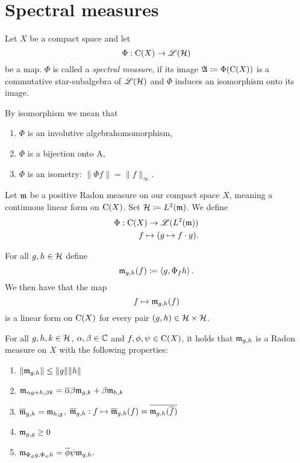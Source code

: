 
\section{Spectral measures}

\begin{defi}
 
 Let $X$ be a compact space and let
 \[
  \Phi : \operatorname{C} (X) \to \mathscr{L}(\mathcal{H})
 \]
be a map. $\Phi$ is called a \textit{spectral measure}, if its image 
$\mathfrak{A} \coloneqq \Phi(\operatorname{C} (X))$ is a commutative star-subalgebra of $\mathscr{L}(\mathcal{H})$ and 
$\Phi$ induces an isomorphism onto its image.
\end{defi}

\begin{rem}
 By isomorphism we mean that
 \begin{enumerate}
  \item $\Phi$ is an involutive algebrahomomorphism,
  \item $\Phi$ is a bijection onto A,
  \item $\Phi$ is an isometry: $\| \Phi f \| = \| f \|_\infty$.
 \end{enumerate}

\end{rem}


Let $\mathfrak{m}$ be a positive Radon measure on our compact space $X$, meaning a
continuous linear form on $\operatorname{C} (X)$. Set $\mathcal{H} \coloneqq L^2(\mathfrak{m})$.
We define 
\begin{align*}
 \Phi : \operatorname{C}(X) \to \mathscr{L}({L^2(\mathfrak{m})}) \\
 f \mapsto (g \mapsto f\cdot g).
\end{align*}

For all $g , h \in \mathcal{H}$ define
\[
 \mathfrak{m}_{g, h} (f) \coloneqq \left\langle g, \Phi_f h \right\rangle.
\]
We then have that the map 
\[
 f \mapsto \mathfrak{m}_{g,h} (f)
\]
is a linear form on $\operatorname{C} (X)$ for every pair $(g, h) \in \mathcal{H} \times \mathcal{H}$.

\begin{thrm}
For all $g, h,k \in \mathcal{H}$, $\alpha, \beta \in \mathbb{C}$ and $f, \phi, \psi \in 
\operatorname{C}(X)$, it holds that $\mathfrak{m}_{g,h}$ is a Radon measure on $X$ with the following 
properties:
\begin{enumerate}[{(}i{)}]
 \item $\| \mathfrak{m}_{g,h}\| \leq \|g\| \|h\|$
 \item $\mathfrak{m}_{\alpha g + h, \beta k} = \overline{\alpha}\beta \mathfrak{m}_{g,k} + 
 \beta \mathfrak{m}_{h,k}$
 \item $\overline{\mathfrak{m}}_{g,h} = \mathfrak{m}_{h,g}$, $\overline{\mathfrak{m}}_{g,h} : 
 f \mapsto \overline{\mathfrak{m}}_{g,h}(f) = \overline{\mathfrak{m}_{g,h}(\overline{f})}$
 \item $\mathfrak{m}_{g,g} \geq 0$
 \item $\mathfrak{m}_{\Phi_\phi g, \Phi_\psi h} = \overline{\phi} \psi \mathfrak{m}_{g,h}.$
\end{enumerate}

\end{thrm}

